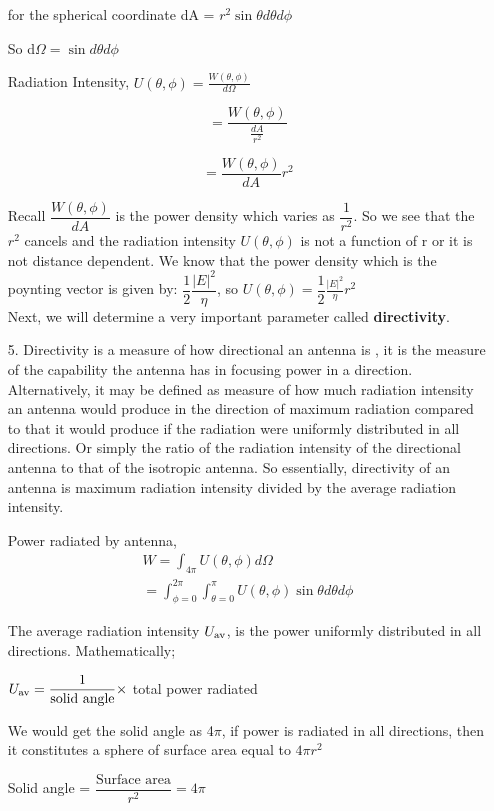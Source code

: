 \begin{enumerate}
for the spherical coordinate dA = $r^{2}\sin \theta d\theta d\phi$

So d$\Omega=\sin d\theta d\phi$

Radiation Intensity, $U(\theta ,\phi) = \frac{W(\theta,\phi)}{d\Omega}$

$$= \frac{W(\theta ,\phi)}{\frac{dA}{r^{2}}}$$

$$= \frac{W(\theta ,\phi)}{dA} r^{2}$$

Recall $\dfrac{W(\theta ,\phi)}{dA}$ is the power density which varies as $\dfrac{1}{r^{2}}$. So we see that the $r^{2}$ cancels and the radiation intensity $U(\theta ,\phi)$ is not a function of r or it is not distance dependent.
We know that the power density which is the poynting vector is given by: $\dfrac{1}{2}\dfrac{|E|^{2}}{\eta}$, so $U(\theta ,\phi)=\dfrac{1}{2}\frac{|E|^{2}}{\eta}r^{2}$\\
Next, we will determine a very important parameter called \textbf{directivity}.
\item[5.] Directivity is a measure of how directional an antenna is , it is the measure of the capability the antenna has in focusing power in a direction. Alternatively, it may be defined as measure of how much radiation intensity an antenna would produce in the direction of maximum radiation compared to that it would produce if the radiation were uniformly distributed in all directions. Or simply the ratio of the radiation intensity of the directional antenna to that of the isotropic antenna.
So essentially, directivity of an antenna  is maximum radiation intensity  divided by the average radiation intensity.

Power radiated by antenna,
\begin{align*}
W=\int_{4\pi}U(\theta ,\phi)d\Omega\\
 =\int_{\phi=0}^{2\pi}\int_{\theta=0}^{\pi}U(\theta,\phi)\sin\theta d\theta d\phi
\end{align*}

The average radiation intensity $U_{\textnormal{av}}$, is the power uniformly distributed in all directions. Mathematically;

$U_{\textnormal{av}}=\dfrac{1}{\textnormal{solid angle}} \times$ total power radiated

We would get the solid angle as 4$\pi$, if power is radiated in all directions, then it constitutes a sphere of surface area equal to $4\pi r^{2}$

Solid angle = $\dfrac{\text{Surface area}}{r^{2}} = 4\pi$


\end{enumerate}
